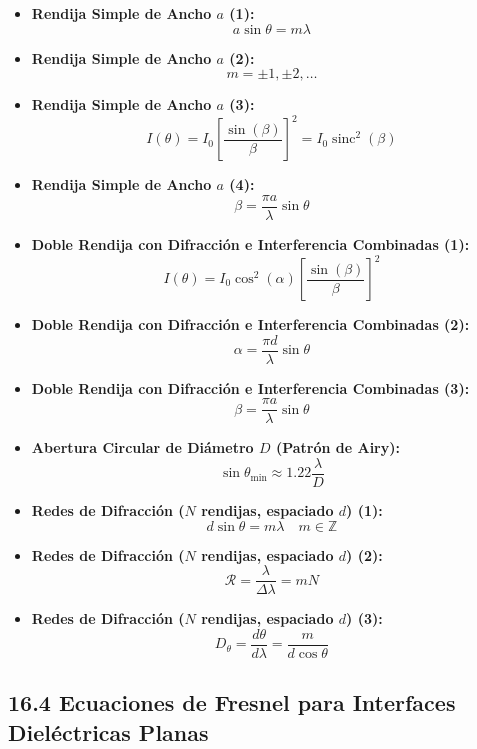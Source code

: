 \documentclass[11pt,a4paper]{article}
\begin{document}
\begin{itemize}
  \item \textbf{Rendija Simple de Ancho $a$ (1):}
  \[
    a \sin\theta = m \lambda
  \]
  \item \textbf{Rendija Simple de Ancho $a$ (2):}
  \[
    m = \pm 1, \pm 2, \dots
  \]
  \item \textbf{Rendija Simple de Ancho $a$ (3):}
  \[
    I(\theta) = I_0 \left[ \frac{\sin(\beta)}{\beta} \right]^2 = I_0 \operatorname{sinc}^2(\beta)
  \]
  \item \textbf{Rendija Simple de Ancho $a$ (4):}
  \[
    \beta = \frac{\pi a}{\lambda}\sin\theta
  \]
  \item \textbf{Doble Rendija con Difracción e Interferencia Combinadas (1):}
  \[
    I(\theta) = I_0 \cos^2(\alpha) \left[ \frac{\sin(\beta)}{\beta} \right]^2
  \]
  \item \textbf{Doble Rendija con Difracción e Interferencia Combinadas (2):}
  \[
    \alpha = \frac{\pi d}{\lambda}\sin\theta
  \]
  \item \textbf{Doble Rendija con Difracción e Interferencia Combinadas (3):}
  \[
    \beta = \frac{\pi a}{\lambda}\sin\theta
  \]
  \item \textbf{Abertura Circular de Diámetro $D$ (Patrón de Airy):}
  \[
    \sin\theta_{\min} \approx 1.22 \frac{\lambda}{D}
  \]
  \item \textbf{Redes de Difracción ($N$ rendijas, espaciado $d$) (1):}
  \[
    d \sin\theta = m \lambda \quad m \in \mathbb{Z}
  \]
  \item \textbf{Redes de Difracción ($N$ rendijas, espaciado $d$) (2):}
  \[
    \mathcal{R} = \frac{\lambda}{\Delta\lambda} = m N
  \]
  \item \textbf{Redes de Difracción ($N$ rendijas, espaciado $d$) (3):}
  \[
    D_\theta = \frac{d\theta}{d\lambda} = \frac{m}{d \cos\theta}
  \]
\end{itemize}

\subsection*{16.4 Ecuaciones de Fresnel para Interfaces Dieléctricas Planas}
\end{document}
